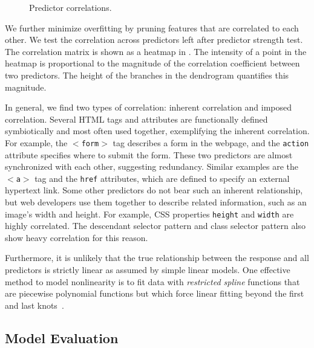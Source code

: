 \begin{figure}[t]
\hspace*{1pt}
\caption{Predictor correlations.}
\label{fig:pred_cor}
\end{figure}

We further minimize overfitting by pruning features that are correlated to each other.  We test the correlation across predictors left after predictor strength test.  The correlation matrix is shown as a heatmap in . The intensity of a point in the heatmap is proportional to the magnitude of the correlation coefficient between two predictors. The height of the branches in the dendrogram quantifies this magnitude.

In general, we find two types of correlation: inherent correlation and imposed correlation. Several HTML tags and attributes are functionally defined symbiotically and most often used together, exemplifying the inherent correlation. For example, the $<$\texttt{form}$>$ tag describes a form in the webpage, and the \texttt{action} attribute specifies where to submit the form. These two predictors are almost synchronized with each other, suggesting redundancy. Similar examples are the $<$\texttt{a}$>$ tag and the \texttt{href} attributes, which are defined to specify an external hypertext link. Some other predictors do not bear such an inherent relationship, but web developers use them together to describe related information, such as an image's width and height. For example, CSS properties \texttt{height} and \texttt{width} are highly correlated. The descendant selector pattern and class selector pattern also show heavy correlation for this reason.

Furthermore, it is unlikely that the true relationship between the response and all predictors is strictly linear as assumed by simple linear models.  One effective method to model nonlinearity is to fit data with \textit{restricted spline} functions that are piecewise polynomial functions but which force linear fitting beyond the first and last knots~\cite{ESL}.

\subsection{Model Evaluation}
\label{sec:model-eval}

